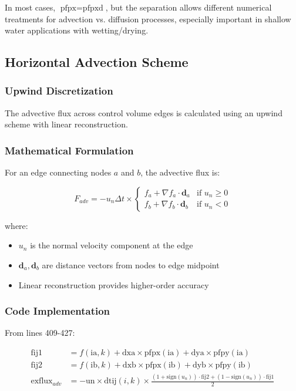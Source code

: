 \documentclass[11pt,a4paper]{article}
\begin{document}
In most cases, $\text{pfpx} = \text{pfpxd}$, but the separation allows different numerical treatments for advection vs. diffusion processes, especially important in shallow water applications with wetting/drying.

\subsection{Horizontal Advection Scheme}

\subsubsection{Upwind Discretization}

The advective flux across control volume edges is calculated using an upwind scheme with linear reconstruction.

\subsubsection{Mathematical Formulation}

For an edge connecting nodes $a$ and $b$, the advective flux is:

\begin{equation}
F_{adv} = -u_n \Delta t \times \begin{cases}
f_a + \nabla f_a \cdot \mathbf{d}_a & \text{if } u_n \geq 0 \\
f_b + \nabla f_b \cdot \mathbf{d}_b & \text{if } u_n < 0
\end{cases}
\end{equation}

where:
\begin{itemize}
\item $u_n$ is the normal velocity component at the edge
\item $\mathbf{d}_a, \mathbf{d}_b$ are distance vectors from nodes to edge midpoint
\item Linear reconstruction provides higher-order accuracy
\end{itemize}

\subsubsection{Code Implementation}

From lines 409-427:

\begin{align}
\text{fij1} &= f(\text{ia},k) + \text{dxa} \times \text{pfpx}(\text{ia}) + \text{dya} \times \text{pfpy}(\text{ia}) \\
\text{fij2} &= f(\text{ib},k) + \text{dxb} \times \text{pfpx}(\text{ib}) + \text{dyb} \times \text{pfpy}(\text{ib}) \\
\text{exflux}_{adv} &= -\text{un} \times \text{dtij}(i,k) \times \frac{(1+\text{sign}(u_n)) \cdot \text{fij2} + (1-\text{sign}(u_n)) \cdot \text{fij1}}{2}
\end{align}
\end{document}
